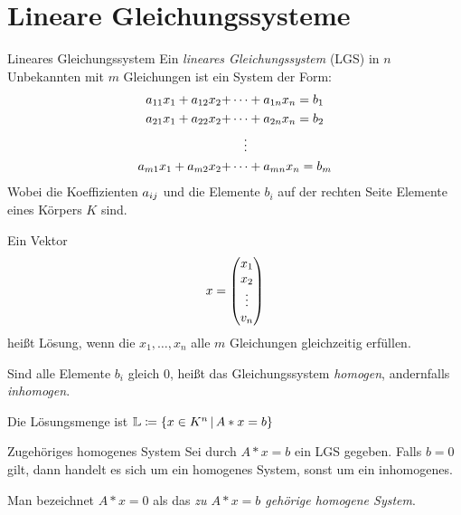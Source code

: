 \chapter{Lineare Gleichungssysteme}
\begin{definition}{Lineares Gleichungssystem}
	Ein \emph{lineares Gleichungssystem} (LGS) in $n$ Unbekannten mit $m$ Gleichungen ist ein System der Form:
	\begin{align*}
		a_{11}x_1+a_{12}x_2+&\cdots+a_{1n}x_n=b_1\\
		a_{21}x_1+a_{22}x_2+&\cdots+a_{2n}x_n=b_2\\
		&\ \ \ \vdots\\
		a_{m1}x_1+a_{m2}x_2+&\cdots+a_{mn}x_n=b_m
	\end{align*}
	Wobei die Koeffizienten $a_{ij}$ und die Elemente $b_i$ auf der rechten Seite Elemente eines Körpers $K$ sind.

	Ein Vektor
	\begin{equation*}
		x=\vector{x_1\\x_2\\\vdots\\v_n}
	\end{equation*}
	heißt Lösung, wenn die $x_1,\ldots, x_n$ alle $m$ Gleichungen gleichzeitig erfüllen.

	Sind alle Elemente $b_i$ gleich $0$, heißt das Gleichungssystem \emph{homogen}, andernfalls \emph{inhomogen}.
\end{definition}

\begin{bemerkung}
	Die Lösungsmenge ist $\mathbb{L}\coloneqq\left\{ x\in K^n \,\middle|\, A*x=b \right\}$
\end{bemerkung}

\begin{definition}{Zugehöriges homogenes System}
	Sei durch $A*x=b$ ein LGS gegeben. Falls $b=0$ gilt, dann handelt es sich um ein homogenes System, sonst um ein inhomogenes.

	Man bezeichnet $A*x=0$ als das \emph{zu $A*x=b$ gehörige homogene System}.
\end{definition}


